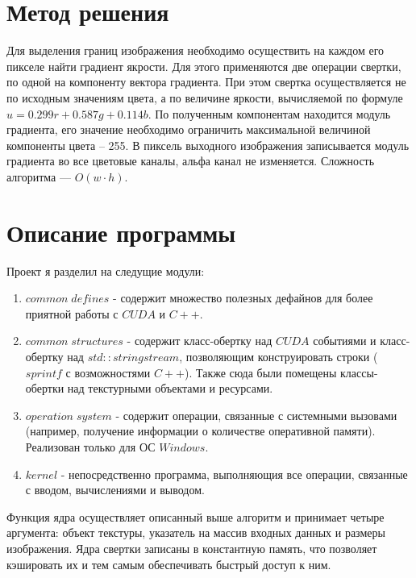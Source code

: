 \section{Метод решения}
Для выделения границ изображения необходимо осуществить на каждом его пикселе найти градиент якрости. 
Для этого применяются две операции свертки, по одной на компоненту вектора градиента. 
При этом свертка осуществляется не по исходным значениям цвета, а по величине яркости, вычисляемой по формуле 
$u = 0.299r +  0.587g + 0.114b$. По полученным компонентам находится модуль градиента, его значение необходимо ограничить 
максимальной величиной компоненты цвета -- 255. 
В пиксель выходного изображения записывается модуль градиента во все цветовые каналы, альфа канал не изменяется. 
Сложность алгоритма --- $O(w \cdot h)$.

\section{Описание программы}
Проект я разделил на следущие модули:
\begin{enumerate}
    \item $common \; defines$ - содержит множество полезных дефайнов для более приятной работы с $CUDA$ и $C++$.
    \item $common \; structures$ - содержит класс-обертку над $CUDA$ событиями и класс-обертку над $std\!::\!stringstream$, позволяющим конструировать строки ($sprintf$ с возможностями $C++$).
    Также сюда были помещены классы-обертки над текстурными объектами и ресурсами.
    \item $operation \; system$ - содержит операции, связанные с системными вызовами (например, получение информации о количестве оперативной памяти). Реализован только для ОС $Windows$.
    \item $kernel$ - непосредственно программа, выполняющия все операции, связанные с вводом, вычислениями и выводом.
\end{enumerate}

Функция ядра осуществляет описанный выше алгоритм и принимает четыре аргумента: объект текстуры, указатель на массив входных данных и размеры изображения.
Ядра свертки записаны в константную память, что позволяет кэшировать их и тем самым обеспечивать быстрый доступ к ним.


